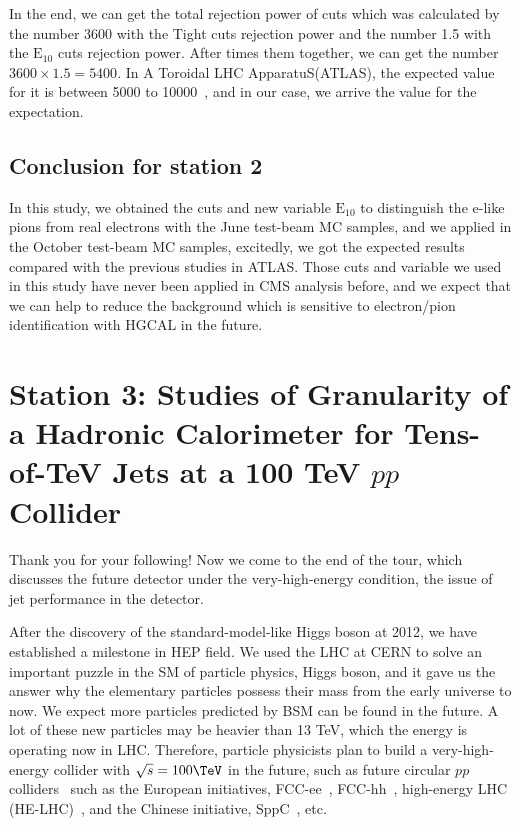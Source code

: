 \documentclass[12pt,twoside,a4paper,an,final]{cms-tdr}
\begin{document}
In the end, we can get the total rejection power of cuts which was calculated by the number 3600 with the Tight cuts rejection power and the number 1.5 with the $\mathrm{E_{10}}$ cuts rejection power. After times them together, we can get the number $3600\times1.5=5400$. In A Toroidal LHC ApparatuS(ATLAS), the expected value for it is between 5000 to 10000~\cite{ATLAS-CONF-2016-024}, and in our case, we arrive the value for the expectation. 
\subsection{Conclusion for station 2}
In this study, we obtained the cuts and new variable $\mathrm{E_{10}}$ to distinguish the e-like pions from real electrons with the June test-beam MC samples, and we applied in the October test-beam MC samples, excitedly, we got the expected results compared with the previous studies in ATLAS. Those cuts and variable we used in this study have never been applied in CMS analysis before, and we expect that we can help to reduce the background which is sensitive to electron/pion identification with HGCAL in the future.

\section{Station 3: Studies of Granularity of a Hadronic Calorimeter for Tens-of-TeV Jets at a 100 TeV $pp$ Collider}
Thank you for your following! Now we come to the end of the tour, which discusses the future detector under the very-high-energy condition, the issue of jet performance in the detector.

After the discovery of the standard-model-like Higgs boson at 2012\cite{Chatrchyan:2012xdj}, we have established a milestone in HEP field. We used the LHC at CERN to solve an important puzzle in the SM of particle physics, Higgs boson, and it gave us the answer why the elementary particles possess their mass\cite{PhysRevLett.13.508} from the early universe to now. We expect more particles predicted by BSM can be found in the future. A lot of these new particles may be heavier than 13 TeV\cite{Contino:2016spe}\cite{Mangano:2016jyj}, which the energy is operating now in LHC. Therefore, particle physicists plan to build a very-high-energy collider with $\sqrt{s} = 100\TeV$ in the future, such as future circular $pp$ colliders~\cite{Mangano:2018mur} such as the European initiatives, FCC-ee~\cite{Benedikt:2651299}, FCC-hh~\cite{Benedikt:2018csr}, high-energy LHC (HE-LHC)~\cite{Zimmermann:2018wdi}, and the Chinese initiative, SppC~\cite{Tang:2015qga}, etc. \\
\end{document}
